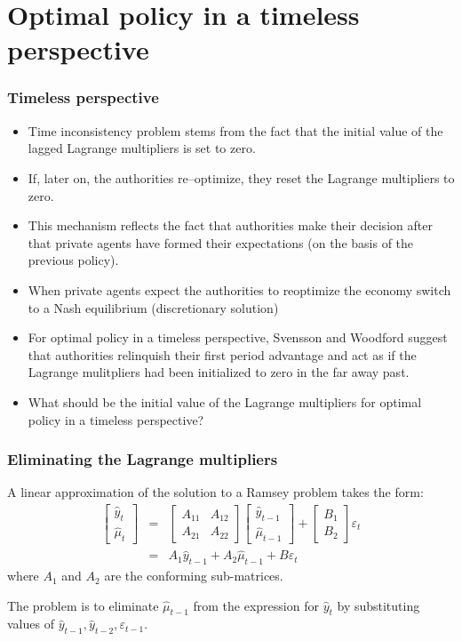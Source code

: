 \documentclass{beamer}
\begin{document}
\section{Optimal policy in a timeless perspective}
\begin{frame}
  \frametitle{Timeless perspective}
{\small
  \begin{itemize}
  \item Time inconsistency problem stems from the fact that the initial value of the lagged Lagrange multipliers is set to zero.
  \item If, later on, the authorities re--optimize, they reset the Lagrange multipliers to zero.
  \item This  mechanism reflects the fact that authorities make their decision after that private agents have formed their expectations (on the basis of the previous policy).
  \item When private agents expect the authorities to reoptimize the economy switch to a Nash equilibrium (discretionary solution)
  \item For optimal policy in a timeless perspective, Svensson and Woodford suggest that authorities relinquish their first period advantage and act as if the Lagrange mulitpliers had been initialized to zero in the far away past.
  \item What should be the initial value of the Lagrange multipliers for optimal policy in  a timeless perspective?  
  \end{itemize}
}
\end{frame}

\begin{frame}
\frametitle{Eliminating the Lagrange multipliers}
A linear approximation of the solution to a Ramsey problem takes the form:
\begin{eqnarray*}
\left[
\begin{array}{c}
  \widehat y_t\\ \widehat\mu_t
\end{array}\right]
&=& \left[
  \begin{array}{cc}
    A_{11} & A_{12} \\ A_{21} & A_{22}
  \end{array}\right]
\left[
  \begin{array}{c}
    \widehat y_{t-1}\\\widehat \mu_{t-1}
  \end{array}\right]+\left[\begin{array}{c} B_1\\ B_2\end{array}\right]\varepsilon_t\\
&=& A_1 \widehat y_{t-1}+A_2\widehat\mu_{t-1}+B\varepsilon_t
\end{eqnarray*}
where $A_1$ and $A_2$ are the conforming sub-matrices.

The problem is to eliminate $\widehat\mu_{t-1}$ from the expression for $\widehat y_t$ by substituting values of $\widehat y_{t-1}, \widehat y_{t-2}, \varepsilon_{t-1}$.
\end{frame}
\end{document}
